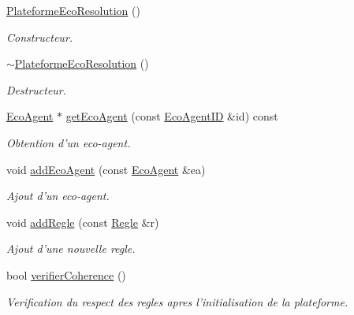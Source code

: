\begin{CompactItemize}
\item 
\hyperlink{classPlateformeEcoResolution_6e03cc2c6a51bc4a47d2d226e41d13e9}{PlateformeEcoResolution} ()
\begin{CompactList}\small\item\em Constructeur. \item\end{CompactList}\item 
\hyperlink{classPlateformeEcoResolution_356b4862f53c4be870304e5186601b5a}{$\sim$PlateformeEcoResolution} ()
\begin{CompactList}\small\item\em Destructeur. \item\end{CompactList}\item 
\hyperlink{classEcoAgent}{EcoAgent} $\ast$ \hyperlink{classPlateformeEcoResolution_ba320298b5b660cb2dff0558f8c5eb31}{getEcoAgent} (const \hyperlink{classEcoAgentID}{EcoAgentID} \&id) const 
\begin{CompactList}\small\item\em Obtention d'un eco-agent. \item\end{CompactList}\item 
void \hyperlink{classPlateformeEcoResolution_45d2074749341698f24086b77f3f3edd}{addEcoAgent} (const \hyperlink{classEcoAgent}{EcoAgent} \&ea)
\begin{CompactList}\small\item\em Ajout d'un eco-agent. \item\end{CompactList}\item 
void \hyperlink{classPlateformeEcoResolution_4b6382c212be5a06de556de5aa8f9e6a}{addRegle} (const \hyperlink{classRegle}{Regle} \&r)
\begin{CompactList}\small\item\em Ajout d'une nouvelle regle. \item\end{CompactList}\item 
bool \hyperlink{classPlateformeEcoResolution_2433694ea90bac8394675aaa3c9829d3}{verifierCoherence} ()
\begin{CompactList}\small\item\em Verification du respect des regles apres l'initialisation de la plateforme. \item\end{CompactList}\item 

\end{CompactItemize}
